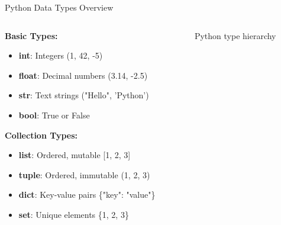 \begin{frame}{Python Data Types Overview}
    \begin{columns}
        \begin{column}{0.5\textwidth}
            \textbf{Basic Types:}
            \begin{itemize}
                \item \textbf{int}: Integers (1, 42, -5)
                \item \textbf{float}: Decimal numbers (3.14, -2.5)
                \item \textbf{str}: Text strings ("Hello", 'Python')
                \item \textbf{bool}: True or False
            \end{itemize}
            
            \textbf{Collection Types:}
            \begin{itemize}
                \item \textbf{list}: Ordered, mutable [1, 2, 3]
                \item \textbf{tuple}: Ordered, immutable (1, 2, 3)
                \item \textbf{dict}: Key-value pairs \{"key": "value"\}
                \item \textbf{set}: Unique elements \{1, 2, 3\}
            \end{itemize}
        \end{column}
        
        \begin{column}{0.5\textwidth}
            \begin{figure}
                \begin{center}
                \end{center}
                \caption{Python type hierarchy}
            \end{figure}
        \end{column}
    \end{columns}
\end{frame}


